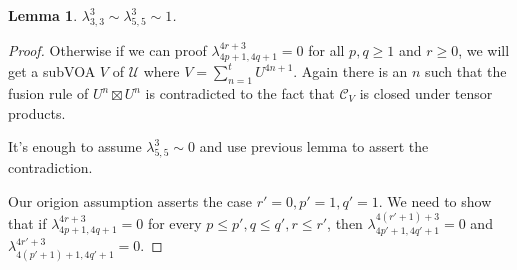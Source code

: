 \documentclass{article}
\newtheorem{lemma}{Lemma}[section]
\begin{document}
\begin{lemma}
$\lambda_{3,3}^3\sim\lambda_{5,5}^3\sim 1$.
\end{lemma}
\begin{proof}
Otherwise if we can proof $\lambda_{4p+1,4q+1}^{4r+3}=0$ for all $p,q\geq 1$ and $r\geq 0$,
we will get a subVOA $V$ of $\mathcal{U}$ where $V=\sum_{n=1}^t U^{4n+1}$.
Again there is an $n$ such that the fusion rule of $U^n\boxtimes U^n$ is contradicted to the fact that $\mathcal{C}_V$ is closed under tensor products.


It's enough to assume $\lambda_{5,5}^3\sim 0$ and use previous lemma to assert the contradiction.








Our origion assumption asserts the case $r'=0,p'=1,q'=1$.
We need to show that if $\lambda_{4p+1,4q+1}^{4r+3}=0$ for every $p\leq p',q\leq q',r\leq r'$,
then $\lambda_{4p'+1,4q'+1}^{4(r'+1)+3}=0$ and  $\lambda_{4(p'+1)+1,4q'+1}^{4r'+3}=0$.


\end{proof}
\end{document}
